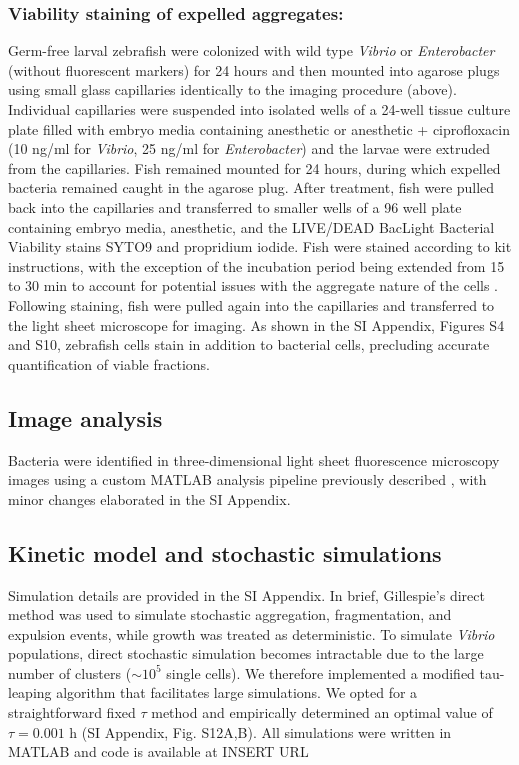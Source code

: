 \subsubsection*{Viability staining of expelled aggregates:}  Germ-free larval zebrafish were colonized with wild type \textit{Vibrio} or \textit{Enterobacter} (without fluorescent markers) for 24 hours and then mounted into agarose plugs using small glass capillaries identically to the imaging procedure (above). Individual capillaries were suspended into isolated wells of a 24-well tissue culture plate filled with embryo media containing anesthetic or anesthetic + ciprofloxacin (10 ng/ml for \textit{Vibrio}, 25 ng/ml for \textit{Enterobacter}) and the larvae were extruded from the capillaries. Fish remained mounted for 24 hours, during which expelled bacteria remained caught in the agarose plug. After treatment, fish were pulled back into the capillaries and transferred to smaller wells of a 96 well plate containing embryo media, anesthetic, and the LIVE/DEAD BacLight Bacterial Viability stains SYTO9 and propridium iodide. Fish were stained according to kit instructions, with the exception of the incubation period being extended from 15 to 30 min to account for potential issues with the aggregate nature of the cells \cite{netuschil2014confusion}.  Following staining, fish were pulled again into the capillaries and transferred to the light sheet microscope for imaging. As shown in the SI Appendix, Figures S4 and S10, zebrafish cells stain in addition to bacterial cells, precluding accurate quantification of viable fractions.

\subsection*{Image analysis}

Bacteria were identified in three-dimensional light sheet fluorescence microscopy images using a custom MATLAB analysis pipeline previously described \cite{Jemielita2014,schlomann2018bacterial}, with minor changes elaborated in the SI Appendix.


\subsection*{Kinetic model and stochastic simulations}
Simulation details are provided in the SI Appendix. In brief, Gillespie's direct method \cite{gillespie1977exact} was used to simulate stochastic aggregation, fragmentation, and expulsion events, while growth was treated as deterministic. To simulate \textit{Vibrio} populations, direct stochastic simulation becomes intractable due to the large number of clusters ($\sim 10^5$ single cells). We therefore implemented a modified tau-leaping algorithm \cite{gillespie2001approximate} that facilitates large simulations. We opted for a straightforward fixed $\tau$ method and empirically determined an optimal value of $\tau = 0.001$ h (SI Appendix, Fig. S12A,B). All simulations were written in MATLAB and code is available at INSERT URL %






